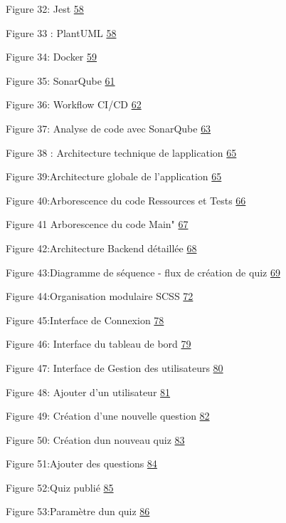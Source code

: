 \documentclass[12pt,a4paper,twoside]{report}
\begin{document}
Figure 32: Jest \protect\hyperlink{_Toc203823442}{58}

Figure 33 : PlantUML \protect\hyperlink{_Toc203823443}{58}

Figure 34: Docker \protect\hyperlink{_Toc203823444}{59}

Figure 35: SonarQube \protect\hyperlink{_Toc203823445}{61}

Figure 36: Workflow CI/CD \protect\hyperlink{_Toc203823446}{62}

Figure 37: Analyse de code avec SonarQube
\protect\hyperlink{_Toc203823447}{63}

Figure 38 : Architecture technique de l\textquotesingle application
\protect\hyperlink{_Toc203823448}{65}

Figure 39:Architecture globale de l'application
\protect\hyperlink{_Toc203823449}{65}

Figure 40:Arborescence du code \textquotesingle Ressources et Tests
\protect\hyperlink{_Toc203823450}{66}

Figure 41 Arborescence du code \textquotesingle Main"
\protect\hyperlink{_Toc203823451}{67}

Figure 42:Architecture Backend détaillée
\protect\hyperlink{_Toc203823452}{68}

Figure 43:Diagramme de séquence - flux de création de quiz
\protect\hyperlink{_Toc203823453}{69}

Figure 44:Organisation modulaire SCSS
\protect\hyperlink{_Toc203823454}{72}

Figure 45:Interface de Connexion \protect\hyperlink{_Toc203823455}{78}

Figure 46: Interface du tableau de bord
\protect\hyperlink{_Toc203823456}{79}

Figure 47: Interface de Gestion des utilisateurs
\protect\hyperlink{_Toc203823457}{80}

Figure 48: Ajouter d'un utilisateur
\protect\hyperlink{_Toc203823458}{81}

Figure 49: Création d'une nouvelle question
\protect\hyperlink{_Toc203823459}{82}

Figure 50: Création d\textquotesingle un nouveau quiz
\protect\hyperlink{_Toc203823460}{83}

Figure 51:Ajouter des questions \protect\hyperlink{_Toc203823461}{84}

Figure 52:Quiz publié \protect\hyperlink{_Toc203823462}{85}

Figure 53:Paramètre d\textquotesingle un quiz
\protect\hyperlink{_Toc203823463}{86}
\end{document}
